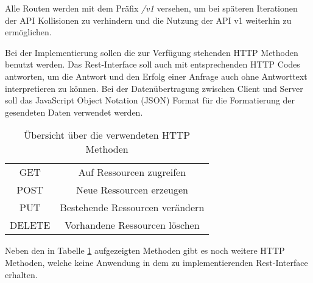 Alle Routen werden mit dem Präfix \textit{/v1} versehen, um bei späteren Iterationen der API Kollisionen zu verhindern und die Nutzung der API v1 weiterhin zu ermöglichen. 

Bei der Implementierung sollen die zur Verfügung stehenden HTTP Methoden benutzt werden. Das Rest-Interface soll auch mit entsprechenden HTTP Codes antworten, um die Antwort und den Erfolg einer Anfrage auch ohne Antworttext interpretieren zu können. Bei der Datenübertragung zwischen Client und Server soll das JavaScript Object Notation (JSON) Format für die Formatierung der gesendeten Daten verwendet werden.

\begin{table}
	\centering
	\begin{tabular}{c c}
		GET & Auf Ressourcen zugreifen \\ 
		POST & Neue Ressourcen erzeugen \\  
		PUT & Bestehende Ressourcen verändern \\
		DELETE & Vorhandene Ressourcen löschen \\
	\end{tabular}
	\caption{Übersicht über die verwendeten HTTP Methoden}
	\label{table:http-methods}
\end{table}

Neben den in Tabelle \ref{table:http-methods} aufgezeigten Methoden gibt es noch weitere HTTP Methoden, welche keine Anwendung in dem zu implementierenden Rest-Interface erhalten.

